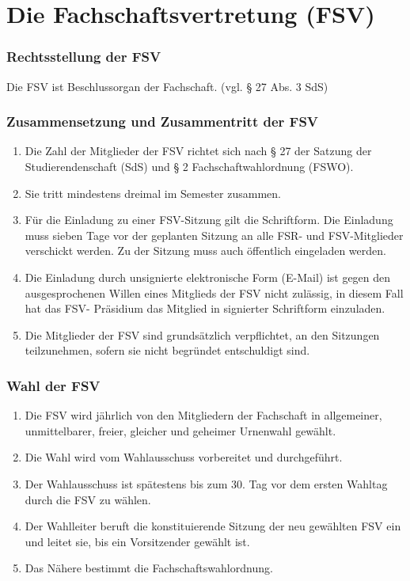\documentclass{article}
\begin{document}
\part{Die Fachschaftsvertretung (FSV)}
\section{Rechtsstellung der FSV}
Die FSV ist Beschlussorgan der Fachschaft. (vgl. § 27 Abs. 3 SdS)

\section{Zusammensetzung und Zusammentritt der FSV}
\begin{enumerate}[(1)]
\item Die Zahl der Mitglieder der FSV richtet sich nach § 27 der Satzung der Studierendenschaft (SdS) und § 2 Fachschaftwahlordnung (FSWO).
\item Sie tritt mindestens dreimal im Semester zusammen.
\item Für die Einladung zu einer FSV-Sitzung gilt die Schriftform. Die Einladung muss sieben Tage vor der geplanten Sitzung an alle FSR- und FSV-Mitglieder verschickt werden. Zu der Sitzung muss auch öffentlich eingeladen werden.
\item Die Einladung durch unsignierte elektronische Form (E-Mail) ist gegen den ausgesprochenen Willen eines Mitglieds der FSV nicht zulässig, in diesem Fall hat das FSV- Präsidium das Mitglied in signierter Schriftform einzuladen.
\item Die Mitglieder der FSV sind grundsätzlich verpflichtet, an den Sitzungen teilzunehmen, sofern sie nicht begründet entschuldigt sind.
\end{enumerate}

\section{Wahl der FSV}
\begin{enumerate}[(1)]
    \item Die FSV wird jährlich von den Mitgliedern der Fachschaft in allgemeiner, unmittelbarer, freier, gleicher und geheimer Urnenwahl gewählt.
    \item Die Wahl wird vom Wahlausschuss vorbereitet und durchgeführt.
    \item Der Wahlausschuss ist spätestens bis zum 30. Tag vor dem ersten Wahltag durch die FSV zu wählen.
    \item Der Wahlleiter beruft die konstituierende Sitzung der neu gewählten FSV ein und leitet sie, bis ein Vorsitzender gewählt ist.
	\item Das Nähere bestimmt die Fachschaftswahlordnung.
\end{enumerate}
\end{document}
